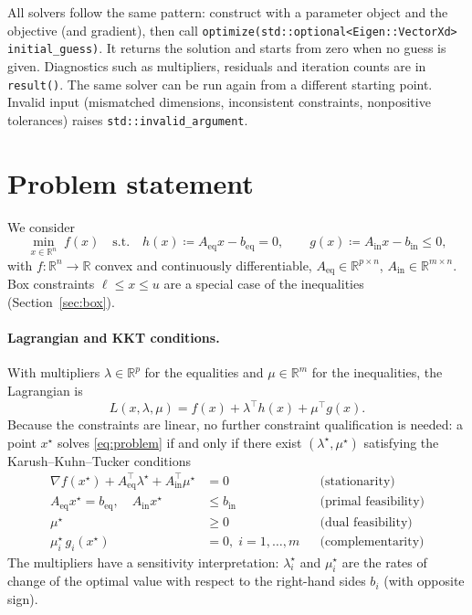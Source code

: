 \documentclass[11pt,a4paper]{article}
\newcommand{\R}{\mathbb{R}}
\newcommand{\Aeq}{A_{\mathrm{eq}}}
\newcommand{\beq}{b_{\mathrm{eq}}}
\newcommand{\Ain}{A_{\mathrm{in}}}
\newcommand{\bin}{b_{\mathrm{in}}}
\begin{document}
All solvers follow the same pattern: construct with a parameter object and the
objective (and gradient), then call
\texttt{optimize(std::optional<Eigen::VectorXd> initial\_guess)}. It returns
the solution and starts from zero when no guess is given. Diagnostics such as
multipliers, residuals and iteration counts are in \texttt{result()}. The same
solver can be run again from a different starting point. Invalid input (mismatched dimensions, inconsistent
constraints, nonpositive tolerances) raises \texttt{std::invalid\_argument}.

\section{Problem statement}

We consider
\begin{equation}\label{eq:problem}
  \min_{x\in\R^n} \; f(x)
  \quad\text{s.t.}\quad
  h(x) \coloneqq \Aeq x - \beq = 0, \qquad
  g(x) \coloneqq \Ain x - \bin \le 0,
\end{equation}
with $f:\R^n\to\R$ convex and continuously differentiable,
$\Aeq\in\R^{p\times n}$, $\Ain\in\R^{m\times n}$. Box constraints
$\ell \le x \le u$ are a special case of the inequalities
(Section~\ref{sec:box}).

\paragraph{Lagrangian and KKT conditions.}
With multipliers $\lambda\in\R^p$ for the equalities and $\mu\in\R^m$ for the
inequalities, the Lagrangian is
\[
  L(x,\lambda,\mu) = f(x) + \lambda^\top h(x) + \mu^\top g(x).
\]
Because the constraints are linear, no further constraint qualification is
needed: a point $x^\star$ solves \eqref{eq:problem} if and only if there exist
$(\lambda^\star,\mu^\star)$ satisfying the Karush--Kuhn--Tucker conditions
\begin{align}
  \nabla f(x^\star) + \Aeq^\top\lambda^\star + \Ain^\top\mu^\star &= 0
    && \text{(stationarity)} \label{eq:kkt-stat}\\
  \Aeq x^\star = \beq, \quad \Ain x^\star &\le \bin
    && \text{(primal feasibility)} \label{eq:kkt-feas}\\
  \mu^\star &\ge 0
    && \text{(dual feasibility)} \\
  \mu^\star_i\, g_i(x^\star) &= 0,\; i=1,\dots,m
    && \text{(complementarity)} \label{eq:kkt-comp}
\end{align}
The multipliers have a sensitivity interpretation: $\lambda^\star_i$ and
$\mu^\star_i$ are the rates of change of the optimal value with respect to the
right-hand sides $b_i$ (with opposite sign).
\end{document}
